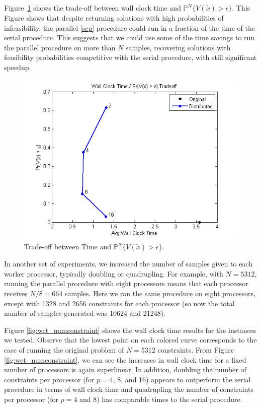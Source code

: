 \documentclass[12pt]{article}
\begin{document}
Figure~\ref{fig:wct_probviolprobgreateps_frontier} shows the trade-off between wall clock time and $\mathbb{P}^N\{V(\tilde{x}) > \epsilon \}$.  
This Figure shows that despite returning solutions with high probabilities of infeasibility, the parallel \ref{scp} procedure could run in a fraction of the time of the serial procedure.
This suggests that we could use some of the time savings to run the parallel procedure on more than $N$ samples, recovering solutions with feasibility probabilities competitive with the serial procedure, with still significant speedup.

\begin{figure}[ht]
	\centering
		\includegraphics[scale=0.9]{../plot/figs/wct_probviolprobgreateps_frontier.png}
	\caption{Trade-off between Time and $\mathbb{P}^N\{V(\tilde{x}) > \epsilon \}$.}
	\label{fig:wct_probviolprobgreateps_frontier}
\end{figure}

In another set of experiments, we increased the number of samples given to each worker processor, typically doubling or quadrupling.
For example, with $N = 5312$, running the parallel procedure with eight processors means that each processor receives $N/8 = 664$ samples.
Here we ran the same procedure on eight processors, except with 1328 and 2656 constraints for each processor (so now the total number of samples generated was 10624 and 21248).

Figure \ref{fig:wct_numconstraint} shows the wall clock time results for the instances we tested.
Observe that the lowest point on each colored curve corresponds to the case of running the original problem of $N = 5312$ constraints.
From Figure \ref{fig:wct_numconstraint}, we can see the increases in wall clock time for a fixed number of processors is again superlinear.
In addition, doubling the number of constraints per processor (for $p =4$, 8, and 16) appears to outperform the serial procedure in terms of wall clock time and quadrupling the number of constraints per processor (for $p = 4$ and 8) has comparable times to the serial procedure.
\end{document}
